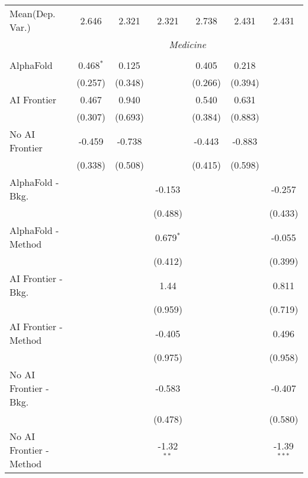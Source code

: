 \begin{tabular}{lcccccc}
Mean(Dep. Var.) & 2.646 & 2.321 & 2.321 & 2.738 & 2.431 & 2.431 \\
 & \multicolumn{6}{c}{\textit{Medicine}} \\ \\
   AlphaFold               & 0.468$^{*}$ & 0.125   &              & 0.405   & 0.218   &   \\   
                           & (0.257)     & (0.348) &              & (0.266) & (0.394) &   \\   
   AI Frontier             & 0.467       & 0.940   &              & 0.540   & 0.631   &   \\   
                           & (0.307)     & (0.693) &              & (0.384) & (0.883) &   \\   
   No AI Frontier          & -0.459      & -0.738  &              & -0.443  & -0.883  &   \\   
                           & (0.338)     & (0.508) &              & (0.415) & (0.598) &   \\   
   AlphaFold - Bkg.        &             &         & -0.153       &         &         & -0.257\\   
                           &             &         & (0.488)      &         &         & (0.433)\\   
   AlphaFold - Method      &             &         & 0.679$^{*}$  &         &         & -0.055\\   
                           &             &         & (0.412)      &         &         & (0.399)\\   
   AI Frontier - Bkg.      &             &         & 1.44         &         &         & 0.811\\   
                           &             &         & (0.959)      &         &         & (0.719)\\   
   AI Frontier - Method    &             &         & -0.405       &         &         & 0.496\\   
                           &             &         & (0.975)      &         &         & (0.958)\\   
   No AI Frontier - Bkg.   &             &         & -0.583       &         &         & -0.407\\   
                           &             &         & (0.478)      &         &         & (0.580)\\   
   No AI Frontier - Method &             &         & -1.32$^{**}$ &         &         & -1.39$^{***}$\\   

\end{tabular}

